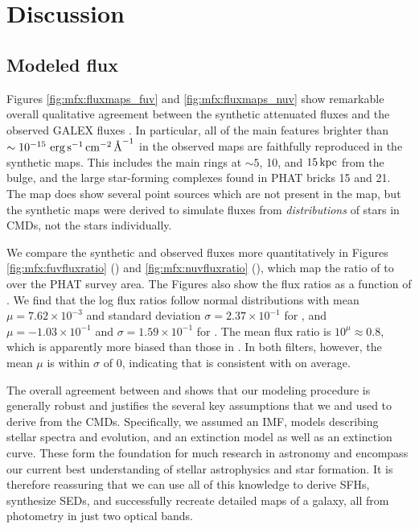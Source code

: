 \section{Discussion}\label{mfx:discussion}

\subsection{Modeled flux}\label{mfx:discussion:modflux}

Figures \ref{fig:mfx:fluxmaps_fuv} and \ref{fig:mfx:fluxmaps_nuv} show
remarkable overall qualitative agreement between the synthetic attenuated
fluxes \fxsfh{} and the observed GALEX fluxes \fxobs{}. In particular, all of
the main features brighter than $\sim 10^{-15}\, \,\mathrm{erg}\,\mathrm{s}^{-1}\,\mathrm{cm}^{-2}\,\textrm{\AA}^{-1}$ in the observed maps
are faithfully reproduced in the synthetic maps. This includes the main rings
at $\sim 5$, 10, and $15\,\mathrm{kpc}$ from the bulge, and the large star-forming
complexes found in PHAT bricks 15 and 21. The \fnuvobs{} map does show several
point sources which are not present in the \fnuvsfh{} map, but the synthetic
maps were derived to simulate fluxes from \emph{distributions} of stars in
CMDs, not the stars individually.

We compare the synthetic and observed fluxes more quantitatively in Figures
\ref{fig:mfx:fuvfluxratio} (\fuv{}) and \ref{fig:mfx:nuvfluxratio} (\nuv{}),
which map the ratio of \fxsfh{} to \fxobs{} over the PHAT survey area. The
Figures also show the flux ratios as a function of \fxobs{}. We find that the
log flux ratios follow normal distributions with mean $\mu = 7.62\times
10^{-3}$ and standard deviation $\sigma = 2.37\times 10^{-1}$ for \fuv{}, and
$\mu = -1.03\times 10^{-1}$ and $\sigma = 1.59\times 10^{-1}$ for \nuv{}. The
mean \nuv{} flux ratio is $10^\mu \approx 0.8$, which is apparently more biased
than those in \fuv{}. In both filters, however, the mean $\mu$ is within
$\sigma$ of 0, indicating that \fxsfh{} is consistent with \fxobs{} on average.

The overall agreement between \fxsfh{} and \fxobs{} shows that our modeling
procedure is generally robust and justifies the several key assumptions that we
and \citet{Lewis:2014} used to derive \fxsfh{} from the CMDs. Specifically, we
assumed an IMF, models describing stellar spectra and evolution, and an
extinction model as well as an extinction curve. These form the foundation for
much research in astronomy and encompass our current best understanding of
stellar astrophysics and star formation. It is therefore reassuring that we can
use all of this knowledge to derive SFHs, synthesize SEDs, and successfully
recreate detailed maps of a galaxy, all from photometry in just two optical
bands.

